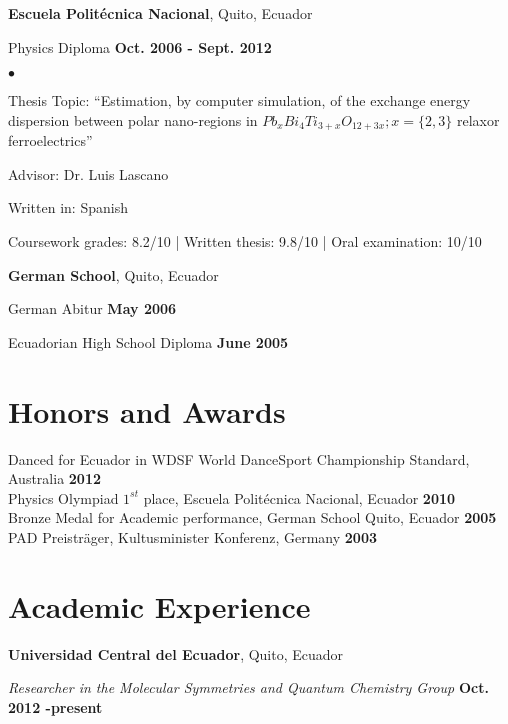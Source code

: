 \documentclass[margin,line]{res}
\newenvironment{list1}{
  \begin{list}{\ding{113}}{%
      \setlength{\itemsep}{0in}
      \setlength{\parsep}{0in} \setlength{\parskip}{0in}
      \setlength{\topsep}{0in} \setlength{\partopsep}{0in} 
      \setlength{\leftmargin}{0.17in}}}{\end{list}}
\newenvironment{list2}{
  \begin{list}{$\bullet$}{%
      \setlength{\itemsep}{0in}
      \setlength{\parsep}{0in} \setlength{\parskip}{0in}
      \setlength{\topsep}{0in} \setlength{\partopsep}{0in} 
      \setlength{\leftmargin}{0.2in}}}{\end{list}}
\begin{document}
\begin{resume}
  {\bf Escuela Politécnica Nacional}, Quito, Ecuador\\
  \vspace{-.1in}
  \begin{list1}
    \item[] Physics Diploma \hfill {\bf Oct. 2006 - Sept. 2012}\\
    \begin{list2}
    \vspace{-.1in}
      \item Thesis Topic:  ``Estimation, by computer simulation, of the exchange
	energy dispersion between polar nano-regions in $Pb_xBi_4Ti_{3+x}O_{12+3x}; x=\{2,3\}$
	relaxor ferroelectrics''
      \item Advisor: Dr. Luis Lascano
      \item Written in: Spanish
      \item Coursework grades: 8.2/10 | Written thesis: 9.8/10 | Oral examination: 10/10
    \end{list2}
  \end{list1}

  {\bf German School}, Quito, Ecuador\\
  \vspace{-.1in}
  \begin{list1}
    \item[] German Abitur \hfill {\bf May 2006}
    \item[] Ecuadorian High School Diploma \hfill {\bf June 2005}
  \end{list1}

\section{\sc Honors and Awards}
  Danced for Ecuador in WDSF World DanceSport Championship Standard, Australia \hfill {\bf 2012}\\
  Physics Olympiad $1^{st}$ place, Escuela Politécnica Nacional, Ecuador \hfill {\bf 2010}\\
  Bronze Medal for Academic performance, German School Quito, Ecuador \hfill {\bf 2005}\\
  PAD Preisträger, Kultusminister Konferenz, Germany \hfill {\bf 2003}

\section{\sc Academic Experience}
  {\bf Universidad Central del Ecuador}, Quito, Ecuador
  \begin{list1}
    \item[] {\em Researcher in the Molecular Symmetries and Quantum Chemistry Group} \hfill {\bf Oct. 2012 -present}
  \end{list1}


\end{resume}
\end{document}
